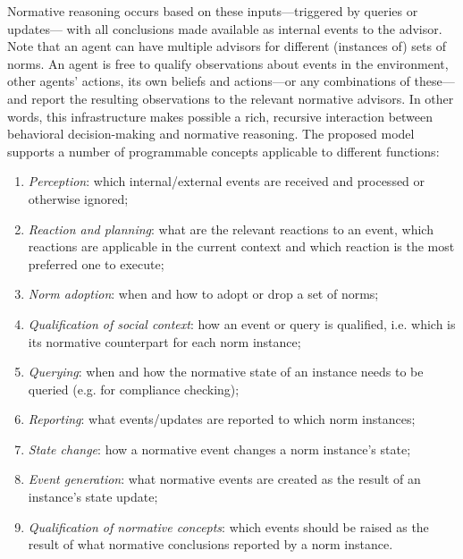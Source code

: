 Normative reasoning occurs based on these inputs---triggered by queries or updates--- with %
all conclusions made available as internal events %
to the advisor. 
%
Note that an agent can have multiple advisors for different (instances of) sets of norms.
%
An agent is free to qualify observations about events in the environment, other agents' actions, its own beliefs and actions---or any combinations of these---and report the resulting observations to the relevant normative advisors. 
%
In other words, this infrastructure makes possible a %
rich, recursive interaction between behavioral decision-making and normative reasoning. %
%
The proposed model supports a number of programmable concepts applicable to different functions:
\begin{enumerate}
    \item \textit{Perception}: which internal/external events are received and processed or otherwise ignored;
    \item \textit{Reaction and planning}: what are the relevant 
    reactions to an event, which reactions are applicable in the current context and which reaction is the most preferred one to execute;
    \item \textit{Norm adoption}: when and how to adopt or drop a set of norms;
    \item \textit{Qualification of social context}: how an event or query is qualified, %
    i.e. which is its normative counterpart for each norm instance;%
    \item \textit{Querying}: when and how the normative state of an instance needs to be queried (e.g. for compliance checking);
    \item \textit{Reporting}: what events/updates are reported to which norm instances;
    \item \textit{State change}: how a normative event changes a norm instance's state;
    \item \textit{Event generation}: what normative events are created as the result of an instance's state update;
    \item \textit{Qualification of normative concepts}: which events should be raised as the result of what normative conclusions reported by a norm instance.%
\end{enumerate}

